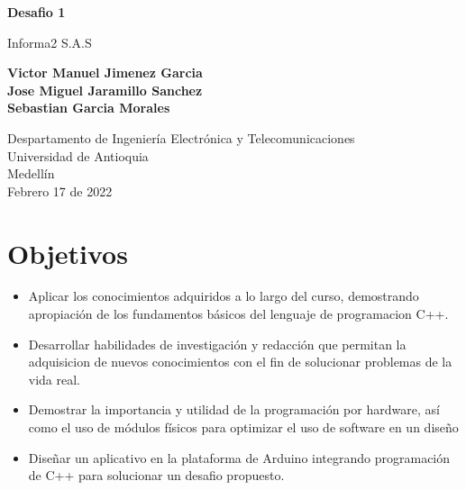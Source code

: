 \documentclass{article}
\begin{document}
\begin{titlepage}
    \begin{center}
        \vspace*{1cm}
            
        \Huge
        \textbf{Desafio 1}
            
        \vspace{0.5cm}
        \LARGE
        Informa2 S.A.S
            
        \vspace{1.5cm}
            
        \textbf{Victor Manuel Jimenez Garcia\\
                Jose Miguel Jaramillo Sanchez\\
                Sebastian Garcia Morales}

        \vfill
            
        \vspace{0.8cm}
            
        \Large
        Despartamento de Ingeniería Electrónica y Telecomunicaciones\\
        Universidad de Antioquia\\
        Medellín\\
        Febrero 17 de 2022
            
    \end{center}
\end{titlepage}

\tableofcontents

\newpage
\section{Objetivos}\label{objetivos}
\begin{itemize}
    \item Aplicar los conocimientos adquiridos a lo largo del curso, demostrando apropiación de los fundamentos básicos del lenguaje de programacion C++.
    \item Desarrollar habilidades de investigación y redacción que permitan la adquisicion de nuevos conocimientos con el fin de solucionar problemas de la vida real.
    \item Demostrar la importancia y utilidad de la programación por hardware, así como el uso de módulos físicos para optimizar el uso de software en un diseño
    \item Diseñar un aplicativo en la plataforma de Arduino integrando programación de C++ para solucionar un desafio  propuesto.
\end{itemize}
\end{document}
